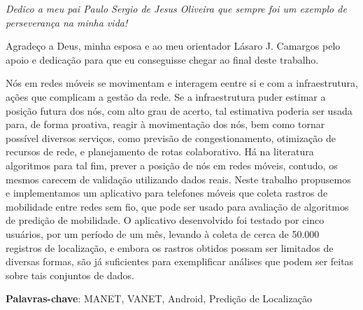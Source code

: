 \documentclass[12pt, %
openright, 
oneside,
a4paper,
brazil]{facom-ufu-abntex2}
\begin{document}
\begin{dedicatoria}
   \vspace*{\fill}
   \centering
   \noindent
   \textit{Dedico a meu pai Paulo Sergio de Jesus Oliveira que sempre foi um exemplo de perseverança na minha vida!}  %
   \vspace*{\fill}
\end{dedicatoria}

\begin{agradecimentos}
Agradeço a Deus, minha esposa e ao meu orientador Lásaro J. Camargos pelo apoio e dedicação para que eu conseguisse chegar ao final deste trabalho. %
\end{agradecimentos}




\begin{resumo} %

Nós  em redes móveis se movimentam e interagem eentre si e com a infraestrutura, ações que complicam a gestão da rede. Se a infraestrutura puder estimar a posição futura dos nós, com alto grau de acerto, tal estimativa poderia ser usada para, de forma proativa, reagir à movimentação dos nós, bem como tornar possível diversos serviços, como previsão de congestionamento, otimização de recursos de rede, e planejamento de rotas colaborativo. Há na literatura algoritmos para tal fim, prever a posição de nós em redes móveis, contudo, os mesmos carecem de validação utilizando dados reais. Neste trabalho propusemos e implementamos um aplicativo para telefones móveis que coleta rastros de mobilidade entre redes sem fio, que pode ser usado para avaliação de algoritmos de predição de mobilidade. O aplicativo desenvolvido foi testado por cinco usuários, por um período de um mês, levando à coleta de cerca de 50.000 registros de localização, e embora os rastros obtidos possam ser limitados de diversas formas, são já suficientes para exemplificar análises que podem ser feitas sobre tais conjuntos de dados.

 \vspace{\onelineskip}
    
 \noindent
 \textbf{Palavras-chave}: MANET, VANET, Android, Predição de Localização%
\end{resumo}
\end{document}
